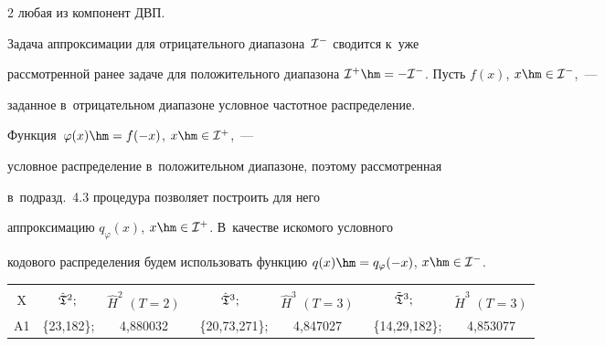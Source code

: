 \begin{multicols}{2}
 любая из компонент ДВП.



Задача аппроксимации для отрицательного диапазона~${\cal I}^-$ сводится к~уже 

рассмотренной ранее задаче для положительного диапазона ${\cal I}^+\hm=

-{\cal I}^-$. Пусть $f(x)$, $x\hm\in{\cal I}^-$,~--- 

заданное в~отрицательном диапазоне условное частотное распределение. 

Функция~$\varphi(x)\hm= f(-x)$, $x\hm\in{\cal I}^+$,~--- 

условное распределение в~положительном диапазоне, поэтому рассмотренная 

в~подразд.~4.3 процедура позволяет построить для него 

аппроксимацию $q_\varphi(x)$, $x\hm\in{\cal I}^+$. В~качестве искомого условного 

кодового распределения будем использовать функцию $q(x)\hm= 

q_\varphi(-x)$, $x\hm\in{\cal I}^-$.




\begin{table}[b]\small

\vspace*{-6pt}

\begin{center}


\label{tab7}

\vspace{2ex}



\begin{tabular}{|c|cc|cc|cc|}

\hline

&&&&&&\\[-9pt]

 X & $\hat{\frak T}^2;$ & $\hat{H}^2$ $(T=2)$ & $\hat{\frak T}^3;$ &

  $\hat{H}^3$ $(T=3)$ & 

$\tilde{\frak T}^3;$ & $\tilde{H}^3$ $(T=3)$ \\


\hline

A1 & \{23,182\}; &  4,880032 & ~\{20,73,271\}; &  4,847027 & ~\{14,29,182\}; &  4,853077 \\


\end{tabular}
\end{center}
\end{table}
\end{multicols}
